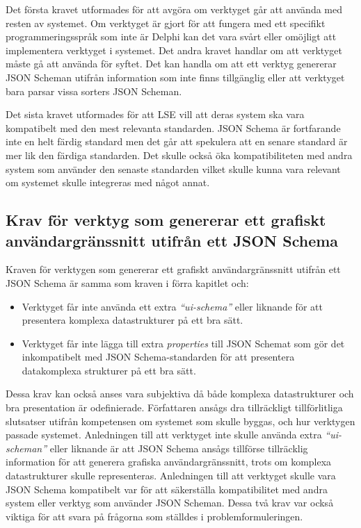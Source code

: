 Det första kravet utformades för att avgöra om verktyget går att använda med resten av systemet. Om verktyget är gjort för att fungera med ett specifikt programmeringsspråk som inte är Delphi kan det vara svårt eller omöjligt att implementera verktyget i systemet. Det andra kravet handlar om att verktyget måste gå att använda för syftet. Det kan handla om att ett verktyg genererar JSON Scheman utifrån information som inte finns tillgänglig eller att verktyget bara parsar vissa sorters JSON Scheman.

Det sista kravet utformades för att LSE vill att deras system ska vara kompatibelt med den mest relevanta standarden. JSON Schema är fortfarande inte en helt färdig standard men det går att spekulera att en senare standard är mer lik den färdiga standarden. Det skulle också öka kompatibiliteten med andra system som använder den senaste standarden vilket skulle kunna vara relevant om systemet skulle integreras med något annat.

\subsection{Krav för verktyg som genererar ett grafiskt användargränssnitt utifrån ett JSON Schema}
Kraven för verktygen som genererar ett grafiskt användargränssnitt utifrån ett JSON Schema är samma som kraven i förra kapitlet och:

\begin{itemize}
	\item Verktyget får inte använda ett extra \textit{``ui-schema''} eller liknande för att presentera komplexa datastrukturer på ett bra sätt.
	\item Verktyget får inte lägga till extra \textit{properties} till JSON Schemat som gör det inkompatibelt med JSON Schema-standarden för att presentera datakomplexa strukturer på ett bra sätt.
\end{itemize}

Dessa krav kan också anses vara subjektiva då både komplexa datastrukturer och bra presentation är odefinierade. Författaren ansågs dra tillräckligt tillförlitliga slutsatser utifrån kompetensen om systemet som skulle byggas, och hur verktygen passade systemet. Anledningen till att verktyget inte skulle använda extra \textit{``ui-scheman''} eller liknande är att JSON Schema ansågs tillförse tillräcklig information för att generera grafiska användargränssnitt, trots om komplexa datastrukturer skulle representeras. Anledningen till att verktyget skulle vara JSON Schema kompatibelt var för att säkerställa kompatibilitet med andra system eller verktyg som använder JSON Scheman. Dessa två krav var också viktiga för att svara på frågorna som ställdes i problemformuleringen.


